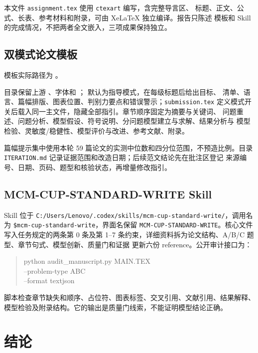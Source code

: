 \documentclass[UTF8,a4paper,12pt]{ctexart}
\begin{document}
本文件 \texttt{assignment.tex} 使用 \texttt{ctexart} 编写，含完整导言区、
标题、正文、公式、长表、参考材料和附录，可由 XeLaTeX 独立编译。报告只陈述
模板和 Skill 的完成情况，不把两者全文嵌入，三项成果保持独立。

\subsection{双模式论文模板}

模板实际路径为 。\par
目录保留上游
、字体和
； 默认为指导模式，在每级标题后给出目标、
清单、语言、篇幅排版、图表位置、判别力要点和错误警示；\texttt{submission.tex}
定义模式开关后载入同一主文件，隐藏全部指引。章节顺序固定为摘要与关键词、
问题重述、问题分析、模型假设、符号说明、分问题模型建立与求解、结果分析与
模型检验、灵敏度/稳健性、模型评价与改进、参考文献、附录。

篇幅提示集中使用本轮 59 篇论文的实测中位数和四分位范围，不预造比例。目录
\texttt{ITERATION.md} 记录证据范围和改造日期；后续范文结论先在批注区登记
来源编号、日期、页码、题型和核验状态，再增量修改指引。

\subsection{MCM-CUP-STANDARD-WRITE Skill}

Skill 位于
\texttt{C:/Users/Lenovo/.codex/skills/mcm-cup-standard-write/}，调用名为
\texttt{\$mcm-cup-standard-write}，界面名保留
\texttt{MCM-CUP-STANDARD-WRITE}。核心文件写入任务规定的两条第 0 条及第 1--7
条约束，详细资料拆为论文结构、A/B/C 题型、章节句式、模型创新、质量门和证据
更新六份 reference。公开审计接口为：
\begin{quote}
\small\ttfamily
python audit\_manuscript.py MAIN.TEX\\
\hspace*{1em}--problem-type A\textbar B\textbar C\\
\hspace*{1em}--format text\textbar json
\end{quote}
脚本检查章节缺失和顺序、占位符、图表标签、交叉引用、文献引用、结果解释、
模型检验及附录结构。它的输出是质量门线索，不能证明模型结论正确。

\section{结论}
\end{document}
